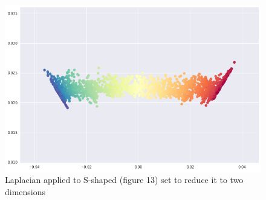 \documentclass[a4paper]{article}
\begin{document}
\begin{figure}[H]

\centering
\includegraphics[scale = 0.32]{laplacian_part3.png}
\caption{\label{fig:laplacian_part3}Laplacian applied to S-shaped  (figure 13) set to reduce it to two dimensions}
\end{figure}






\newpage
\cite{Kokiopoulou2011}
\cite{Ghodsi2006}
\cite{Projections}


\end{document}
